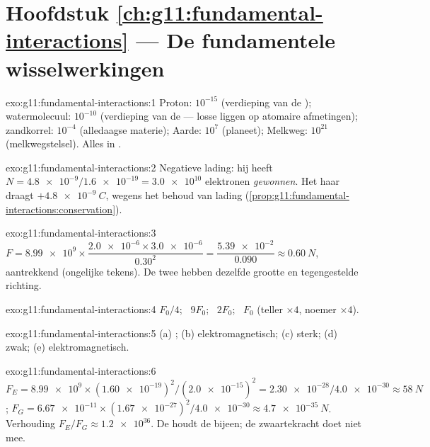 \section*{Hoofdstuk \ref{ch:g11:fundamental-interactions} --- De fundamentele wisselwerkingen}

\begin{solution}{exo:g11:fundamental-interactions:1}
Proton: $10^{-15}$ (verdieping van de ); watermolecuul:
$10^{-10}$ (verdieping van de  --- losse  liggen op
atomaire afmetingen); zandkorrel: $10^{-4}$ (alledaagse materie); Aarde:
$10^{7}$ (planeet); Melkweg: $10^{21}$ (melkwegstelsel). Alles in .
\end{solution}

\begin{solution}{exo:g11:fundamental-interactions:2}
Negatieve lading: hij heeft
$N = \num{4.8e-9}/\num{1.6e-19} = \num{3.0e10}$ elektronen
\emph{gewonnen}. Het haar draagt $+\qty{4.8e-9}{C}$, wegens het behoud
van lading (\cref{prop:g11:fundamental-interactions:conservation}).
\end{solution}

\begin{solution}{exo:g11:fundamental-interactions:3}
$F = \num{8.99e9} \times \dfrac{\num{2.0e-6} \times \num{3.0e-6}}{0.30^2}
= \dfrac{\num{5.39e-2}}{0.090} \approx \qty{0.60}{N}$, aantrekkend
(ongelijke tekens). De twee  hebben dezelfde grootte en
tegengestelde richting.
\end{solution}

\begin{solution}{exo:g11:fundamental-interactions:4}
$F_0/4$; \ $9F_0$; \ $2F_0$; \ $F_0$ (teller $\times 4$, noemer
$\times 4$).
\end{solution}

\begin{solution}{exo:g11:fundamental-interactions:5}
(a) ; (b) elektromagnetisch; (c) sterk; (d) zwak;
(e) elektromagnetisch.
\end{solution}

\begin{solution}{exo:g11:fundamental-interactions:6}
$F_E = \num{8.99e9} \times (\num{1.60e-19})^2/(\num{2.0e-15})^2
= \num{2.30e-28}/\num{4.0e-30} \approx \qty{58}{N}$;
$F_G = \num{6.67e-11} \times (\num{1.67e-27})^2/\num{4.0e-30}
\approx \qty{4.7e-35}{N}$. Verhouding $F_E/F_G \approx \num{1.2e36}$. De
 houdt de  bijeen; de zwaartekracht doet niet
mee.
\end{solution}

